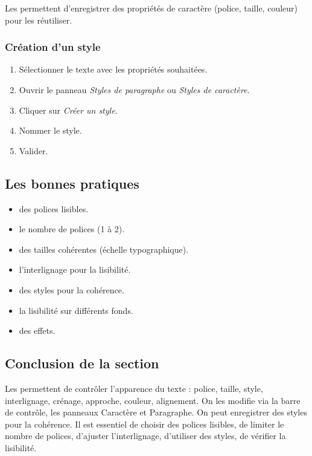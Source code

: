 Les  permettent d'enregistrer des propriétés de caractère (police, taille, couleur) pour les réutiliser.

\subsubsection{Création d'un style}

\begin{enumerate}
    \item Sélectionner le texte avec les propriétés souhaitées.
    \item Ouvrir le panneau \emph{Styles de paragraphe} ou \emph{Styles de caractère}.
    \item Cliquer sur \emph{Créer un style}.
    \item Nommer le style.
    \item Valider.
\end{enumerate}

\subsection{Les bonnes pratiques}

\begin{itemize}
    \item {} des polices lisibles.
    \item {} le nombre de polices (1 à 2).
    \item {} des tailles cohérentes (échelle typographique).
    \item {} l'interlignage pour la lisibilité.
    \item {} des styles pour la cohérence.
    \item {} la lisibilité sur différents fonds.
    \item {} des effets.
\end{itemize}

\subsection*{Conclusion de la section}

Les  permettent de contrôler l'apparence du texte : police, taille, style, interlignage, crénage, approche, couleur, alignement. On les modifie via la barre de contrôle, les panneaux Caractère et Paragraphe. On peut enregistrer des styles pour la cohérence. Il est essentiel de choisir des polices lisibles, de limiter le nombre de polices, d'ajuster l'interlignage, d'utiliser des styles, de vérifier la lisibilité.

